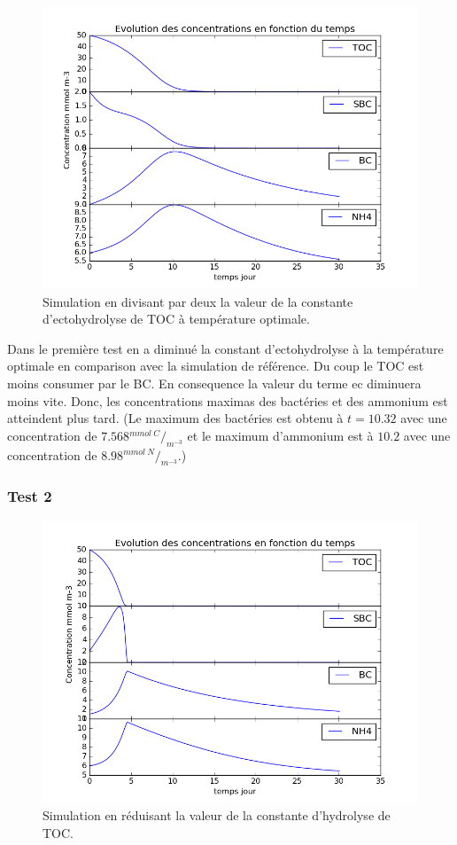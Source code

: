 \begin{figure}[h!]
  \includegraphics[width=\textwidth]{partie1/Test1.png}
  \caption{Simulation en divisant par deux la valeur de la constante d'ectohydrolyse de TOC \`a temp\'erature optimale.
  }
  \label{fig:partie1test1}
\end{figure}
\par{
Dans le première test en a diminué la constant d'ectohydrolyse à la température optimale en comparison avec
la simulation de référence. Du coup le TOC est moins consumer par le BC. En consequence la valeur du terme
ec diminuera moins vite. Donc, les concentrations maximas des bactéries et des ammonium est atteindent
plus tard. (Le maximum des bactéries est obtenu à $t=10.32$ avec une concentration de
$7.568 {^{mmol~C}/_{m^{-3}}}$ et le maximum d'ammonium est à $10.2$ avec une concentration de
$8.98 {^{mmol~N}/_{m^{-3}}}$.)
}

\FloatBarrier
\newpage
\subsubsection{Test 2}

\begin{figure}[h!]
  \includegraphics[width=\textwidth]{partie1/Test2.png}
  \caption{Simulation en r\'eduisant la valeur de la constante d'hydrolyse de TOC.
  }
  \label{fig:partie1test2}
\end{figure}

